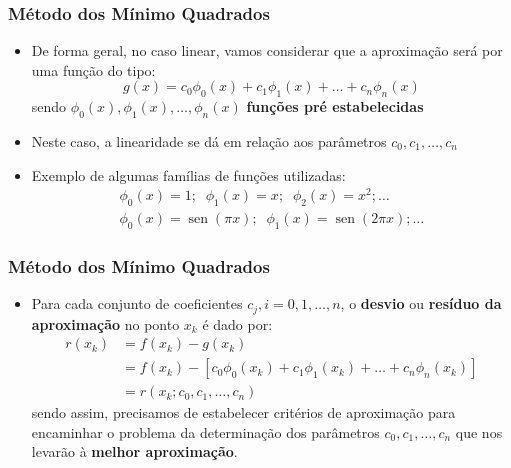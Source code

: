 \documentclass{beamer}
\newcommand{\sen}{\operatorname{sen}}
\theoremstyle{mystyle}
\begin{document}
	\begin{frame}
		\frametitle{Método dos Mínimo Quadrados}	
		\begin{itemize}
			\item  De forma geral, no caso linear, vamos considerar que a aproximação será por uma função do tipo:
			\begin{equation}\label{Eq.0}
				g(x) = c_{0}\phi_{0}(x) + c_{1}\phi_{1}(x) +\ldots+ c_{n}\phi_{n}(x)
			\end{equation}
			sendo $ \phi_{0}(x), \phi_{1}(x),\ldots,\phi_{n}(x) $ \textbf{funções pré estabelecidas}
			\item Neste caso, a linearidade se dá em relação aos parâmetros $ c_{0},c_{1},\ldots,c_{n} $
			\item Exemplo de algumas famílias de funções utilizadas:
			\begin{gather*}
				\phi_{0}(x) = 1;\;\; \phi_{1}(x) = x;\;\; \phi_{2}(x) = x^{2};\ldots\\
				\phi_{0}(x) = \sen(\pi x);\;\; \phi_{1}(x) = \sen(2\pi x);\ldots
			\end{gather*}
		\end{itemize}
	\end{frame}
	
	\begin{frame}
		\frametitle{Método dos Mínimo Quadrados}	
		\begin{itemize}
			\item  Para cada conjunto de coeficientes $ c_{j}, i = 0,1,\ldots,n $, o \textbf{desvio} ou \textbf{resíduo da aproximação} no ponto $ x_{k} $ é dado por:
			\begin{align*}
				r(x_{k}) &= f(x_{k}) - g(x_{k})\\
						 &= f(x_{k}) - [c_{0}\phi_{0}(x_{k}) + c_{1}\phi_{1}(x_{k}) +\ldots+ c_{n}\phi_{n}(x_{k})]\\
						 &= r(x_{k}; c_{0},c_{1},\ldots,c_{n})
			\end{align*}
			sendo assim, precisamos de estabelecer critérios de aproximação para encaminhar o problema da determinação dos parâmetros 	$ c_{0},c_{1},\ldots,c_{n} $ que nos levarão à \textbf{melhor aproximação}.
		\end{itemize}
	\end{frame}
	
\end{document}
